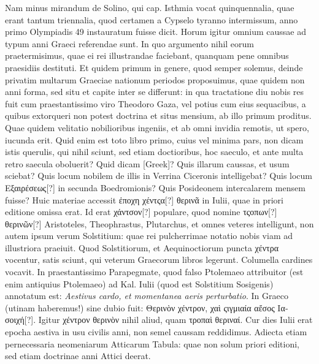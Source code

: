 Nam minus mirandum de Solino, qui cap. 
 Isthmia vocat
quinquennalia, quae erant tantum triennalia, quod certamen a Cypselo
tyranno intermissum, anno primo Olympiadis 49 instauratum
fuisse dicit.
Horum igitur omnium caussae ad typum anni Graeci referendae
sunt.
In quo argumento nihil eorum praetermisimus, quae
ei rei illustrandae faciebant, quanquam pene omnibus praesidiis
destituti.
Et quidem primum in genere, quod semper solemus, deinde
privatim multarum Graeciae nationum periodos proposuimus,
quae quidem non anni forma, sed situ et capite inter se differunt: in
qua tractatione diu nobis res fuit cum praestantissimo viro Theodoro
Gaza, vel potius cum eius sequacibus, a quibus extorqueri non
potest doctrina et situs mensium, ab illo primum proditus. 
Quae quidem
velitatio nobilioribus ingeniis, et ab omni invidia remotis, ut
spero, iucunda erit.
Quid enim est toto libro primo, cuius vel minima
pars, non dicam istis querulis, qui nihil sciunt, sed etiam doctioribus,
hoc saeculo, et ante multa retro saecula oboluerit?
Quid dicam \textgreek{[Greek]}?
Quis illarum caussas, et usum sciebat?
Quis
locum nobilem de illis in Verrina Ciceronis intelligebat?
Quis locum
\textgreek{Εξαιρέσεως[?]} in secunda Boedromionis?
Quis Posideonem intercalarem
mensem fuisse?
Huic materiae accessit \textgreek{ἐποχη χέντςα[?] θερινᾶ}
in  Iulii, quae in priori editione omissa erat.
Id erat \textgreek{χάντσον[?]}
populare, quod nomine \textgreek{τςοπων[?] θερινῶν[?]}
 Aristoteles, Theophrastus,
Plutarchus, et omnes veteres intelligunt, non autem ipsum verum
Solstitium: quae rei pulcherrimae notatio nobis viam ad illustriora
praeiuit.
Quod Solstitiorum, et Aequinoctiorum puncta \textgreek{χέντρα} vocentur,
satis sciunt, qui veterum Graecorum libros legerunt.
Columella
cardines vocavit.
In praestantissimo Parapegmate, quod falso
Ptolemaeo attribuitor (est enim antiquius Ptolemaeo) ad  Kal.
Iulii (quod est Solstitium Sosigenis) annotatum est: \textit{Aestivus cardo,
et momentanea aeris perturbatio}.
In Graeco (utinam haberemus!)
sine dubio fuit: \textgreek{Θερινὸν χέντρον, χαὶ ςιγμιαία αἔσος Ιασοιχή[?]}.
Igitur \textgreek{χέντρον
θερινὸν} nihil aliud, quam \textgreek{τροπαὶ θεριναί}.
Cur  dies Iulii erat
epocha aestiva in usu civilis anni, non semel caussam reddidimus. 
Adiecta etiam pernecessaria neomeniarum Atticarum Tabula: quae
non solum priori editioni, sed etiam doctrinae anni Attici deerat.

